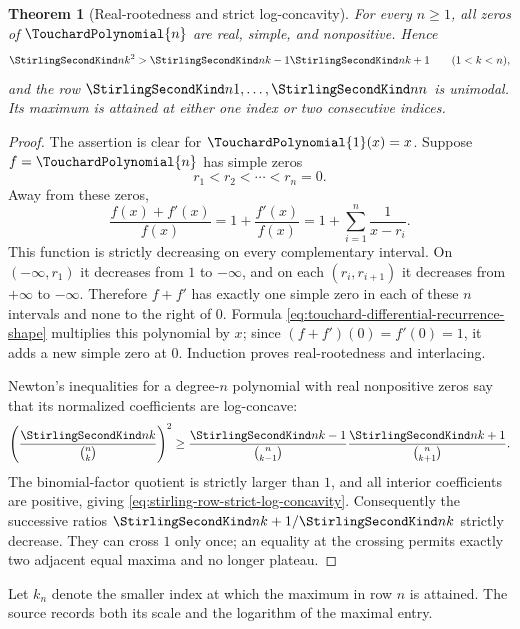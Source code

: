 \documentclass[11pt,a4paper,oneside,openany]{book}
\newtheorem{theorem}{Theorem}[chapter]
\theoremstyle{definition}
\theoremstyle{remark}
\begin{document}
\begin{theorem}[Real-rootedness and strict log-concavity]
\label{thm:stirling-row-log-concavity}
For every $n\ge1$, all zeros of $\TouchardPolynomial{n}$ are real, simple, and nonpositive.  Hence
\begin{equation}
\label{eq:stirling-row-strict-log-concavity}
 \StirlingSecondKind nk^2>\StirlingSecondKind n{k-1}\StirlingSecondKind n{k+1}
 \qquad(1<k<n),
\end{equation}
and the row
$\StirlingSecondKind n1,\ldots,\StirlingSecondKind nn$ is unimodal.  Its maximum is attained at either
one index or two consecutive indices.
\end{theorem}
\begin{proof}
The assertion is clear for $\TouchardPolynomial{1}(x)=x$.  Suppose $f=\TouchardPolynomial{n}$ has simple zeros
\[
 r_1<r_2<\cdots<r_n=0.
\]
Away from these zeros,
\[
 \frac{f(x)+f'(x)}{f(x)}=1+\frac{f'(x)}{f(x)}
 =1+\sum_{i=1}^{n}\frac1{x-r_i}.
\]
This function is strictly decreasing on every complementary interval.  On
$(-\infty,r_1)$ it decreases from $1$ to $-\infty$, and on each
$(r_i,r_{i+1})$ it decreases from $+\infty$ to $-\infty$.  Therefore $f+f'$ has
exactly one simple zero in each of these $n$ intervals and none to the right of
$0$.  Formula \eqref{eq:touchard-differential-recurrence-shape} multiplies this
polynomial by $x$; since $(f+f')(0)=f'(0)=1$, it adds a new simple zero at $0$.
Induction proves real-rootedness and interlacing.

Newton's inequalities for a degree-$n$ polynomial with real nonpositive zeros say
that its normalized coefficients are log-concave:
\[
 \left(\frac{\StirlingSecondKind nk}{\binom nk}\right)^2
 \ge
 \frac{\StirlingSecondKind n{k-1}}{\binom n{k-1}}
 \frac{\StirlingSecondKind n{k+1}}{\binom n{k+1}}.
\]
The binomial-factor quotient is strictly larger than $1$, and all interior
coefficients are positive, giving \eqref{eq:stirling-row-strict-log-concavity}.
Consequently the successive ratios
$\StirlingSecondKind n{k+1}/\StirlingSecondKind nk$ strictly decrease.  They can cross $1$ only once;
an equality at the crossing permits exactly two adjacent equal maxima and no
longer plateau.
\end{proof}

Let $k_n$ denote the smaller index at which the maximum in row $n$ is attained.
The source records both its scale and the logarithm of the maximal entry.
\end{document}
